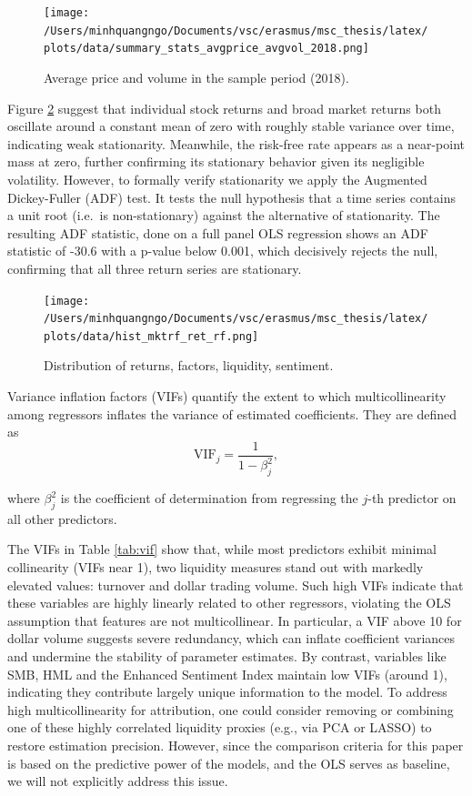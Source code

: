 \begin{figure}[H]
     \centering
     \texttt{[image: /Users/minhquangngo/Documents/vsc/erasmus/msc\_thesis/latex/plots/data/summary\_stats\_avgprice\_avgvol\_2018.png]}
     \caption{Average price and volume in the sample period (2018).}
     \label{fig:avgprice_avgvol_2018}
 \end{figure}
 
 Figure \ref{fig:his_mktrf_ret_rf} suggest that individual stock returns and broad market returns both oscillate around a constant mean of zero with roughly stable variance over time, indicating weak stationarity. Meanwhile, the risk-free rate appears as a near-point mass at zero, further confirming its stationary behavior given its negligible volatility. However, to formally verify stationarity we apply the Augmented Dickey-Fuller (ADF) test. It tests the null hypothesis that a time series contains a unit root (i.e.\ is non-stationary) against the alternative of stationarity. The resulting ADF statistic, done on a full panel OLS regression shows an ADF statistic of -30.6 with a p-value below 0.001, which decisively rejects the null, confirming that all three return series are stationary.


\begin{figure}[H]
     \centering
     \texttt{[image: /Users/minhquangngo/Documents/vsc/erasmus/msc\_thesis/latex/plots/data/hist\_mktrf\_ret\_rf.png]}
     \caption{Distribution of returns, factors, liquidity, sentiment.}
     \label{fig:his_mktrf_ret_rf}
 \end{figure}

 Variance inflation factors (VIFs) quantify the extent to which multicollinearity among regressors inflates the variance of estimated coefficients. They are defined as
 \begin{equation}
 \label{eq:vif}
\mathrm{VIF}_j = \frac{1}{1 - \beta_j^2},
\end{equation}

where $\beta_j^2$ is the coefficient of determination from regressing the $j$-th predictor on all other predictors.

 The VIFs in Table \ref{tab:vif} show that, while most predictors exhibit minimal collinearity (VIFs near 1), two liquidity measures stand out with markedly elevated values: turnover and dollar trading volume. Such high VIFs indicate that these variables are highly linearly related to other regressors, violating the OLS assumption that features are not multicollinear. In particular, a VIF above 10 for dollar volume suggests severe redundancy, which can inflate coefficient variances and undermine the stability of parameter estimates. By contrast, variables like SMB, HML and the Enhanced Sentiment Index maintain low VIFs (around 1), indicating they contribute largely unique information to the model. To address high multicollinearity for attribution, one could consider removing or combining one of these highly correlated liquidity proxies (e.g., via PCA or LASSO) to restore estimation precision. However, since the comparison criteria for this paper is based on the predictive power of the models, and the OLS serves as baseline, we will not explicitly address this issue.


